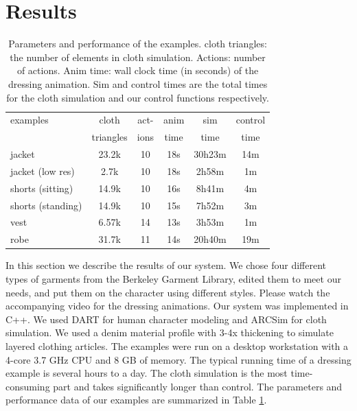 \section{Results}
\begin{table}[b]
  \centering
  \begin{tabular}{|l|c|c|c|c|c|}
    \hline
    examples 		& cloth 	& act- 	& anim	& sim 		& control \\
                    & triangles & 	ions& time 	& time 		& time \\
    \hline
    jacket 			& 23.2k  	& 10	& 18s 	& 30h23m	&  14m  \\
    jacket (low res)& 2.7k		& 10	& 18s	& 2h58m		& 1m \\
    shorts (sitting) 	& 14.9k 	& 10	& 16s 	&  8h41m 	& 4m \\
    shorts (standing)	& 14.9k 	& 10	& 15s	&  7h52m	& 3m \\
    vest 			& 6.57k		& 14	& 13s	&  3h53m	& 1m   \\
    robe 			& 31.7k 	& 11	& 14s	& 20h40m	& 19m  \\
    \hline
  \end{tabular}
  \caption{Parameters and performance of the examples. cloth triangles: the number of elements in cloth simulation. Actions: number of actions. Anim time: wall clock time (in seconds) of the dressing animation. Sim and control times are the total times for the cloth simulation and our control functions respectively.}
  \label{table:data}
\end{table}


In this section we describe the results of our system. We chose four different types of garments from the Berkeley Garment Library, edited them to meet our needs, and put them on the character using different styles. Please watch the accompanying video for the dressing animations. Our system was implemented in C++. We used DART \cite{Liu:2012:STM} for human character modeling and ARCSim \cite{Narain:2012:AAR} for cloth simulation. We used a denim material profile with 3-4x thickening to simulate layered clothing articles. The examples were run on a desktop workstation with a 4-core 3.7 GHz CPU and 8 GB of memory. The typical running time of a dressing example is several hours to a day. The cloth simulation is the most time-consuming part and takes significantly longer than control. The parameters and performance data of our examples are summarized in Table
 \ref{table:data}. 


